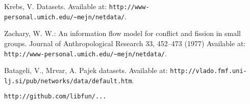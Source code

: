 \documentclass{llncs}
\begin{document}
\begin{thebibliography}{}
Krebs, V.
Datasets. 
Available at: \texttt{http://www-personal.umich.edu/\~{}mejn/netdata/}.

Zachary, W. W.:
An information flow model for conflict and fission in small groups.
Journal of Anthropological Research 33, 452--473 (1977)
Available at: \texttt{http://www-personal.umich.edu/\~{}mejn/netdata/}.

Batageli, V., Mrvar, A.
Pajek datasets. 
Available at: \texttt{http://vlado.fmf.uni-lj.si/pub/networks/data/default.htm}.

\texttt{http://github.com/libfun/...}

\end{thebibliography}
\end{document}
